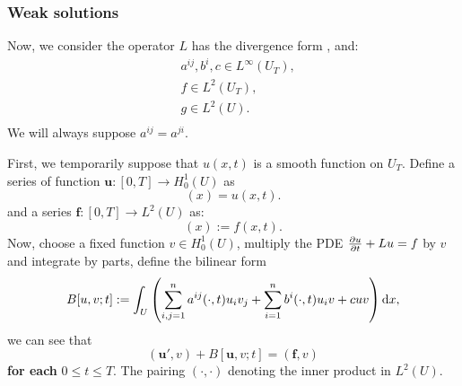 \subsubsection{Weak solutions}
Now, we consider the operator $L$ has the divergence form , and:
\begin{equation}
    \label{eq:weak_sol_conditions}
    \begin{aligned}
        &a^{ij},b^{i},c\in L^{\infty}(U_{T}),\\
        &f\in L^{2}(U_{T}),\\
        &g\in L^{2}(U).\\
    \end{aligned}
\end{equation}
We will always suppose $a^{ij}=a^{ji}$.

First, we temporarily suppose that $u(x,t)$ is a smooth function on $U_{T}$. Define a series of function $\mathbf{u}:[0,T]\rightarrow H_{0}^{1}(U)$ as 
\begin{equation}
    [\mathbf{u}(t)](x)=u(x,t).
\end{equation}
and a series $\mathbf{f}:[0,T]\rightarrow L^{2}(U)$ as:
\begin{equation}
    [\mathbf{f}(t)](x):=f(x,t).
\end{equation}
Now, choose a fixed function $v\in H_{0}^{1}(U)$, multiply the PDE $\frac{\partial u}{\partial t}+Lu=f$ by $v$ and integrate by parts, define the bilinear form 
\begin{equation}
    \label{eq:bilinear_for_parabolic}
    B[u,v;t]:=\int_{U}\left(\sum_{i,j=1}^{n}a^{ij}(\cdot,t)u_{i}v_{j}+\sum_{i=1}^{n}b^{i}(\cdot,t)u_{i}v+cuv\right)\mathrm{d} x,
\end{equation}
we can see that 
\begin{equation}
    \label{eq:variation_form}
    (\mathbf{u}',v)+B[\mathbf{u},v;t]=(\mathbf{f},v)
\end{equation}
\textbf{for each }$0\le t\le T$. The pairing $(\cdot,\cdot)$ denoting the inner product in $L^{2}(U)$.

